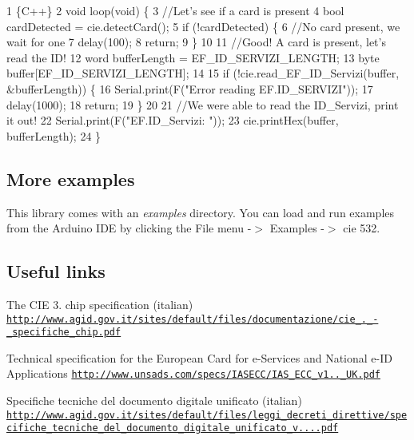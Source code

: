 \begin{DoxyCode}
1 \{C++\}
2 void loop(void) \{
3   //Let's see if a card is present
4   bool cardDetected = cie.detectCard();
5   if (!cardDetected) \{
6     //No card present, we wait for one
7     delay(100);
8     return;
9   \}
10 
11   //Good! A card is present, let's read the ID!
12   word bufferLength = EF\_ID\_SERVIZI\_LENGTH;
13   byte buffer[EF\_ID\_SERVIZI\_LENGTH];
14 
15   if (!cie.read\_EF\_ID\_Servizi(buffer, &bufferLength)) \{
16     Serial.print(F("Error reading EF.ID\_SERVIZI"));
17     delay(1000);
18     return;
19   \}
20 
21   //We were able to read the ID\_Servizi, print it out!
22   Serial.print(F("EF.ID\_Servizi: "));
23   cie.printHex(buffer, bufferLength);
24 \}
\end{DoxyCode}


\subsection*{More examples}

This library comes with an {\itshape examples} directory. You can load and run examples from the Arduino I\+DE by clicking the File menu -\/$>$ Examples -\/$>$ cie 532.

\subsection*{Useful links}


\begin{DoxyItemize}
\item The C\+IE 3. chip specification (italian) \href{http://www.agid.gov.it/sites/default/files/documentazione/cie_3.0_-_specifiche_chip.pdf}{\tt http\+://www.\+agid.\+gov.\+it/sites/default/files/documentazione/cie\+\_.\+\_\+-\/\+\_\+specifiche\+\_\+chip.\+pdf}
\item Technical specification for the European Card for e-\/\+Services and National e-\/\+ID Applications \href{http://www.unsads.com/specs/IASECC/IAS_ECC_v1.0.1_UK.pdf}{\tt http\+://www.\+unsads.\+com/specs/\+I\+A\+S\+E\+C\+C/\+I\+A\+S\+\_\+\+E\+C\+C\+\_\+v1..\+\_\+\+U\+K.\+pdf}
\item Specifiche tecniche del documento digitale unificato (italian) \href{http://www.agid.gov.it/sites/default/files/leggi_decreti_direttive/specifiche_tecniche_del_documento_digitale_unificato_v.1.0.0.pdf}{\tt http\+://www.\+agid.\+gov.\+it/sites/default/files/leggi\+\_\+decreti\+\_\+direttive/specifiche\+\_\+tecniche\+\_\+del\+\_\+documento\+\_\+digitale\+\_\+unificato\+\_\+v....\+pdf} 
\end{DoxyItemize}